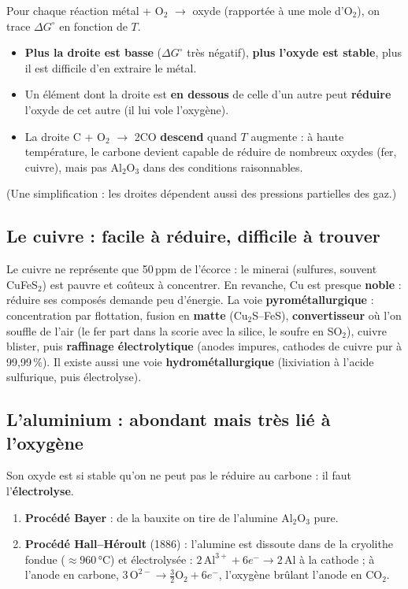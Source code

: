 \begin{defnbox}[title={Lire le diagramme d'Ellingham}]
Pour chaque réaction \og métal + O$_2$ $\to$ oxyde\fg{} (rapportée à une mole d'O$_2$), on trace
$\Delta G^\circ$ en fonction de $T$.
\begin{itemize}
  \item \textbf{Plus la droite est basse} ($\Delta G^\circ$ très négatif), \textbf{plus
        l'oxyde est stable}, plus il est difficile d'en extraire le métal.
  \item Un élément dont la droite est \textbf{en dessous} de celle d'un autre peut
        \textbf{réduire} l'oxyde de cet autre (il lui \og vole\fg{} l'oxygène).
  \item La droite C + O$_2$ $\to$ 2CO \textbf{descend} quand $T$ augmente : à haute
        température, le carbone devient capable de réduire de nombreux oxydes (fer, cuivre),
        mais pas Al$_2$O$_3$ dans des conditions raisonnables.
\end{itemize}
(Une simplification : les droites dépendent aussi des pressions partielles des gaz.)
\end{defnbox}

\subsection*{Le cuivre : facile à réduire, difficile à trouver}

Le cuivre ne représente que 50\,ppm de l'écorce : le minerai (sulfures, souvent
CuFeS$_2$) est pauvre et coûteux à concentrer. En revanche, Cu est presque \textbf{noble} :
réduire ses composés demande peu d'énergie. La voie \textbf{pyrométallurgique} : concentration
par flottation, fusion en \textbf{matte} (Cu$_2$S--FeS), \textbf{convertisseur} où l'on souffle de
l'air (le fer part dans la scorie avec la silice, le soufre en SO$_2$), cuivre blister, puis
\textbf{raffinage électrolytique} (anodes impures, cathodes de cuivre pur à 99,99\,\%). Il existe
aussi une voie \textbf{hydrométallurgique} (lixiviation à l'acide sulfurique, puis
électrolyse).

\subsection*{L'aluminium : abondant mais très lié à l'oxygène}

Son oxyde est si stable qu'on ne peut pas le réduire au carbone : il faut
l'\textbf{électrolyse}.
\begin{enumerate}
  \item \textbf{Procédé Bayer} : de la bauxite on tire de l'alumine Al$_2$O$_3$ pure.
  \item \textbf{Procédé Hall--Héroult} (1886) : l'alumine est dissoute dans de la cryolithe
        fondue ($\approx 960$\,°C) et électrolysée : $2\,\text{Al}^{3+} + 6e^- \to 2\,\text{Al}$
        à la cathode ; à l'anode en carbone, $3\,\text{O}^{2-} \to \frac32\text{O}_2 + 6e^-$,
        l'oxygène brûlant l'anode en CO$_2$.
\end{enumerate}

